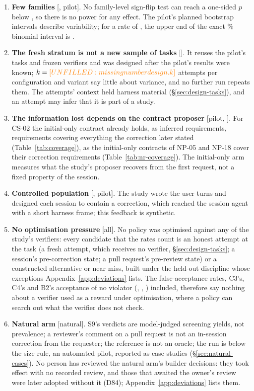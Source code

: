 \begin{enumerate}
\item \textbf{Few families} [\texttt{\FRESHRUN}, pilot]. No family-level sign-flip test can reach a one-sided $p$ below , so there is no power for any effect. The pilot's planned bootstrap intervals describe variability; for a rate of , the upper end of the exact \% binomial interval is .
\item \textbf{The fresh stratum is not a new sample of tasks} [\texttt{\FRESHRUN}]. It reuses the pilot's tasks and frozen verifiers and was designed after the pilot's results were known; $k=\dv{design.k}$ attempts per configuration and variant say little about variance, and no further run repeats them. The attempts' context held harness material (\S\ref{sec:design-tasks}), and an attempt may infer that it is part of a study.
\item \textbf{The information lost depends on the contract proposer} [pilot, \texttt{\FRESHRUN}]. For CS-02 the initial-only contract already holds, as inferred requirements, requirements covering everything the correction later stated (Table~\ref{tab:coverage}), as the initial-only contracts of NP-05 and NP-18 cover their correction requirements (Table~\ref{tab:nr-coverage}). The initial-only arm measures what the study's proposer recovers from the first request, not a fixed property of the session.
\item \textbf{Controlled population} [\texttt{\FRESHRUN}, pilot]. The study wrote the user turns and designed each session to contain a correction, which reached the session agent with a short harness frame; this feedback is synthetic.
\item \textbf{No optimisation pressure} [all]. No policy was optimised against any of the study's verifiers: every candidate that the rates count is an honest attempt at the task (a fresh attempt, which receives no verifier, \S\ref{sec:design-tasks}; a session's pre-correction state; a pull request's pre-review state) or a constructed alternative or near miss, built under the held-out discipline whose exceptions Appendix~\ref{app:deviations} lists. The false-acceptance rates, C3's, C4's and B2's acceptance of no violator (, , ) included, therefore say nothing about a verifier used as a reward under optimisation, where a policy can search out what the verifier does not check.
\item \textbf{Natural arm} [natural]. S9's verdicts are model-judged screening yields, not prevalence; a reviewer's comment on a pull request is not an in-session correction from the requester; the reference is not an oracle; the run is below the size rule, an automated pilot, reported as case studies (\S\ref{sec:natural-cases}). No person has reviewed the natural arm's builder decisions: they took effect with no recorded review, and those that awaited the owner's review were later adopted without it (D84); Appendix~\ref{app:deviations} lists them.

\end{enumerate}
